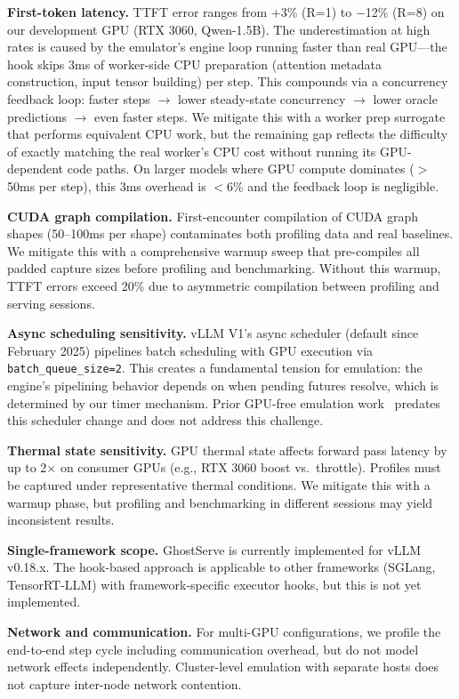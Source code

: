 \documentclass[conference]{IEEEtran}
\newcommand{\sysname}{GhostServe}
\begin{document}
\textbf{First-token latency.} TTFT error ranges from +3\% (R=1) to $-$12\% (R=8) on our development GPU (RTX 3060, Qwen-1.5B). The underestimation at high rates is caused by the emulator's engine loop running faster than real GPU---the hook skips 3ms of worker-side CPU preparation (attention metadata construction, input tensor building) per step. This compounds via a concurrency feedback loop: faster steps $\rightarrow$ lower steady-state concurrency $\rightarrow$ lower oracle predictions $\rightarrow$ even faster steps. We mitigate this with a worker prep surrogate that performs equivalent CPU work, but the remaining gap reflects the difficulty of exactly matching the real worker's CPU cost without running its GPU-dependent code paths. On larger models where GPU compute dominates ($>$50ms per step), this 3ms overhead is $<$6\% and the feedback loop is negligible.

\textbf{CUDA graph compilation.} First-encounter compilation of CUDA graph shapes (50--100ms per shape) contaminates both profiling data and real baselines. We mitigate this with a comprehensive warmup sweep that pre-compiles all padded capture sizes before profiling and benchmarking. Without this warmup, TTFT errors exceed 20\% due to asymmetric compilation between profiling and serving sessions.

\textbf{Async scheduling sensitivity.} vLLM V1's async scheduler (default since February 2025) pipelines batch scheduling with GPU execution via \texttt{batch\_queue\_size=2}. This creates a fundamental tension for emulation: the engine's pipelining behavior depends on when pending futures resolve, which is determined by our timer mechanism. Prior GPU-free emulation work~\cite{agrawal2024revati} predates this scheduler change and does not address this challenge.

\textbf{Thermal state sensitivity.} GPU thermal state affects forward pass latency by up to 2$\times$ on consumer GPUs (e.g., RTX 3060 boost vs.\ throttle). Profiles must be captured under representative thermal conditions. We mitigate this with a warmup phase, but profiling and benchmarking in different sessions may yield inconsistent results.

\textbf{Single-framework scope.} \sysname{} is currently implemented for vLLM v0.18.x. The hook-based approach is applicable to other frameworks (SGLang, TensorRT-LLM) with framework-specific executor hooks, but this is not yet implemented.

\textbf{Network and communication.} For multi-GPU configurations, we profile the end-to-end step cycle including communication overhead, but do not model network effects independently. Cluster-level emulation with separate hosts does not capture inter-node network contention.
\end{document}
